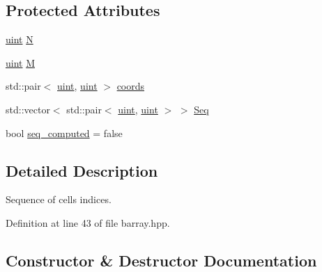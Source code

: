 \subsection*{Protected Attributes}
\begin{DoxyCompactItemize}
\item 
\hyperlink{namespacebarray_af9756a31953db233f80a9cfe1ef31c32}{uint} \hyperlink{classbarray_1_1_cell_seq_a9f2198b5a2acdcac50395f93b04bc04c}{N}
\item 
\hyperlink{namespacebarray_af9756a31953db233f80a9cfe1ef31c32}{uint} \hyperlink{classbarray_1_1_cell_seq_a4af3a2d3555d9fa5d73ba2b4d60f0806}{M}
\item 
std\+::pair$<$ \hyperlink{namespacebarray_af9756a31953db233f80a9cfe1ef31c32}{uint}, \hyperlink{namespacebarray_af9756a31953db233f80a9cfe1ef31c32}{uint} $>$ \hyperlink{classbarray_1_1_cell_seq_a784f078d11ad20735dd17dba9966e419}{coords}
\item 
std\+::vector$<$ std\+::pair$<$ \hyperlink{namespacebarray_af9756a31953db233f80a9cfe1ef31c32}{uint}, \hyperlink{namespacebarray_af9756a31953db233f80a9cfe1ef31c32}{uint} $>$ $>$ \hyperlink{classbarray_1_1_cell_seq_aa026242c5a91b405fcc08915a31da236}{Seq}
\item 
bool \hyperlink{classbarray_1_1_cell_seq_a681fe627c2d8b932d8114e91cc8982e0}{seq\+\_\+computed} = false
\end{DoxyCompactItemize}


\subsection{Detailed Description}
Sequence of cells indices. 



Definition at line 43 of file barray.\+hpp.



\subsection{Constructor \& Destructor Documentation}
\mbox{\label{classbarray_1_1_cell_seq_a3f1fcc18a3e9a9572d403791368f0db7}} 
